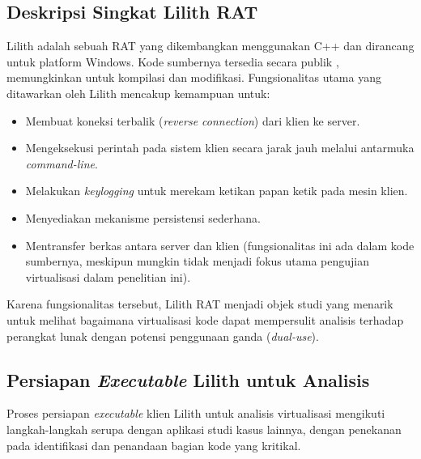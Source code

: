 \subsection{Deskripsi Singkat Lilith RAT}
Lilith adalah sebuah RAT yang dikembangkan menggunakan C++ dan dirancang untuk platform Windows. Kode sumbernya tersedia secara publik \cite{LilithRAT}, memungkinkan untuk kompilasi dan modifikasi. Fungsionalitas utama yang ditawarkan oleh Lilith mencakup kemampuan untuk:
\begin{itemize}
    \item Membuat koneksi terbalik (\textit{reverse connection}) dari klien ke server.
    \item Mengeksekusi perintah pada sistem klien secara jarak jauh melalui antarmuka \textit{command-line}.
    \item Melakukan \textit{keylogging} untuk merekam ketikan papan ketik pada mesin klien.
    \item Menyediakan mekanisme persistensi sederhana.
    \item Mentransfer berkas antara server dan klien (fungsionalitas ini ada dalam kode sumbernya, meskipun mungkin tidak menjadi fokus utama pengujian virtualisasi dalam penelitian ini).
\end{itemize}
Karena fungsionalitas tersebut, Lilith RAT menjadi objek studi yang menarik untuk melihat bagaimana virtualisasi kode dapat mempersulit analisis terhadap perangkat lunak dengan potensi penggunaan ganda (\textit{dual-use}).

\subsection{Persiapan \textit{Executable} Lilith untuk Analisis}
Proses persiapan \textit{executable} klien Lilith untuk analisis virtualisasi mengikuti langkah-langkah serupa dengan aplikasi studi kasus lainnya, dengan penekanan pada identifikasi dan penandaan bagian kode yang kritikal.

